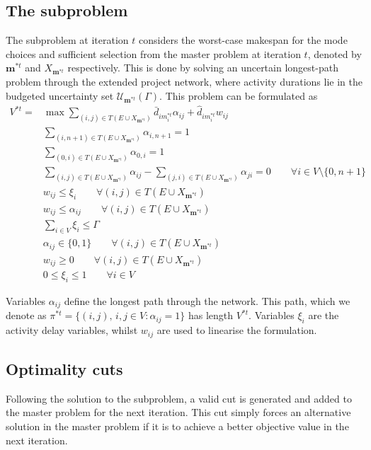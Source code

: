 \documentclass[a4paper,abstracton]{scrartcl}
\newcommand{\U}{{\mathcal{U}}}
\begin{document}
\subsection{The subproblem}
 
The subproblem at iteration $t$ considers the worst-case makespan for the mode choices and sufficient selection from the master problem at iteration $t$, denoted by $\bm{m}^{*t}$ and $X_{\bm{m}^{*t}}$ respectively. This is done by solving an uncertain longest-path problem through the extended project network, where activity durations lie in the budgeted uncertainty set $\U_{\bm{m}^{*t}}(\Gamma)$. This problem can be formulated as 
\begin{align}
	V^{*t} = &\max \sum_{(i,j)\in T(E\cup X_{\bm{m}^{*t}})} \bar{d}_{im^{*t}_i}\alpha_{ij} + \hat{d}_{im^{*t}_i}w_{ij}\label{eqn:subproblem_first}\\
	& \sum_{(i,n+1)\in T(E\cup X_{\bm{m}^{*t}})} \alpha_{i,n+1} = 1\\
	& \sum_{(0,i)\in T(E\cup X_{\bm{m}^{*t}})} \alpha_{0,i} = 1\\
	& \sum_{(i,j)\in T(E\cup X_{\bm{m}^{*t}})} \alpha_{ij} - \sum_{(j,i)\in T(E\cup X_{\bm{m}^{*t}})} \alpha_{ji} = 0 \qquad \forall i \in V\setminus\{0,n+1\}\\
	& w_{ij} \leq \xi_i \qquad \forall (i,j)\in T(E\cup X_{\bm{m}^{*t}})\\
	& w_{ij} \leq \alpha_{ij} \qquad \forall (i,j)\in T(E\cup X_{\bm{m}^{*t}})\\
	& \sum_{i\in V}\xi_i \leq \Gamma\\
	& \alpha_{ij}\in \{0,1\} \qquad \forall (i,j)\in T(E\cup X_{\bm{m}^{*t}})\\
	& w_{ij}\geq 0 \qquad \forall (i,j)\in T(E\cup X_{\bm{m}^{*t}})\\
	& 0\leq \xi_i \leq 1 \qquad \forall i\in V \label{eqn:subproblem_last}
\end{align}

Variables $\alpha_{ij}$ define the longest path through the network. This path, which we denote as $\pi^{*t}=\{(i,j),\,i,j\in V:\alpha_{ij}=1\}$ has length $V^{*t}$. Variables $\xi_i$ are the activity delay variables, whilst $w_{ij}$ are used to linearise the formulation.

\subsection{Optimality cuts} \label{section:optimality_cuts}

Following the solution to the subproblem, a valid cut is generated and added to the master problem for the next iteration. This cut simply forces an alternative solution in the master problem if it is to achieve a better objective value in the next iteration. 
\end{document}
